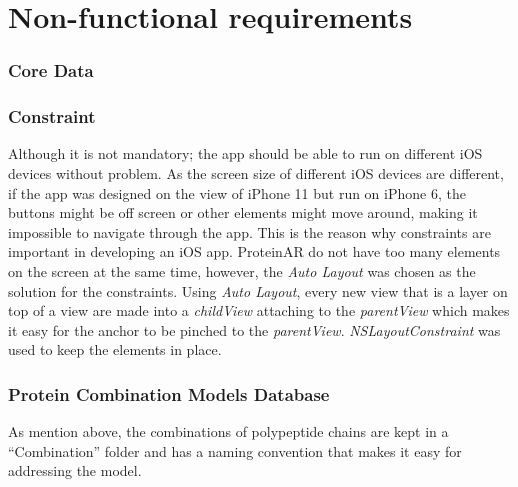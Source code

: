 \section{Non-functional requirements}
\subsubsection{Core Data}
\subsubsection{Constraint}
Although it is not mandatory; the app should be able to run on different iOS devices without problem. As the screen size of different iOS devices are different, if the app was designed on the view of iPhone 11 but run on iPhone 6, the buttons might be off screen or other elements might move around, making it impossible to navigate through the app. This is the reason why constraints are important in developing an iOS app. ProteinAR do not have too many elements on the screen at the same time, however, the \emph{Auto Layout} was chosen as the solution for the constraints. Using \emph{Auto Layout}, every new view that is a layer on top of a view are made into a \emph{childView} attaching to the \emph{parentView} which makes it easy for the anchor to be pinched to the \emph{parentView}. \emph{NSLayoutConstraint} was used to keep the elements in place. 
\subsubsection{Protein Combination Models Database}
As mention above, the combinations of polypeptide chains are kept in a “Combination” folder and has a naming convention that makes it easy for addressing the model. 


 

